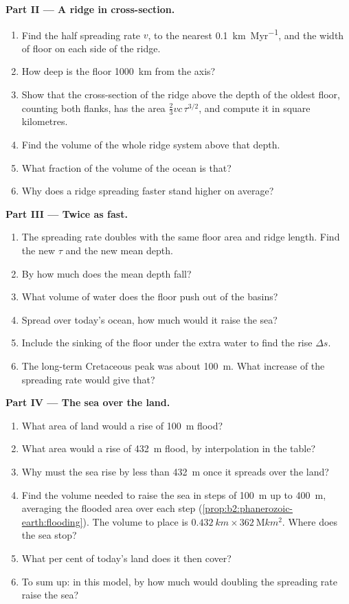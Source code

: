 \begin{problem}
\noindent\textbf{Part II --- A ridge in cross-section.}
\begin{enumerate}[resume]
  \item Find the half spreading rate $v$, to the nearest \qty{0.1}{km.Myr^{-1}}, and the width
        of floor on each side of the ridge.
  \item How deep is the floor \qty{1000}{km} from the axis?
  \item Show that the cross-section of the ridge above the depth of the oldest floor, counting
        both flanks, has the area $\tfrac23 v c\,\tau^{3/2}$, and compute it in
        square kilometres.
  \item Find the volume of the whole ridge system above that depth.
  \item What fraction of the volume of the ocean is that?
  \item Why does a ridge spreading faster stand higher on average?
\end{enumerate}

\noindent\textbf{Part III --- Twice as fast.}
\begin{enumerate}[resume]
  \item The spreading rate doubles with the same floor area and ridge length. Find the new $\tau$
        and the new mean depth.
  \item By how much does the mean depth fall?
  \item What volume of water does the floor push out of the basins?
  \item Spread over today's ocean, how much would it raise the sea?
  \item Include the sinking of the floor under the extra water to find the rise $\Delta s$.
  \item The long-term Cretaceous peak was about \qty{100}{m}. What increase of the spreading rate
        would give that?
\end{enumerate}

\noindent\textbf{Part IV --- The sea over the land.}
\begin{enumerate}[resume]
  \item What area of land would a rise of \qty{100}{m} flood?
  \item What area would a rise of \qty{432}{m} flood, by interpolation in the table?
  \item Why must the sea rise by less than \qty{432}{m} once it spreads over the land?
  \item Find the volume needed to raise the sea in steps of \qty{100}{m} up to \qty{400}{m},
        averaging the flooded area over each step (\cref{prop:b2:phanerozoic-earth:flooding}).
        The volume to place is $\qty{0.432}{km} \times \qty{362}{\mega km^2}$. Where does the
        sea stop?
  \item What per cent of today's land does it then cover?
  \item To sum up: in this model, by how much would doubling the spreading rate raise the sea?
\end{enumerate}
\end{problem}
